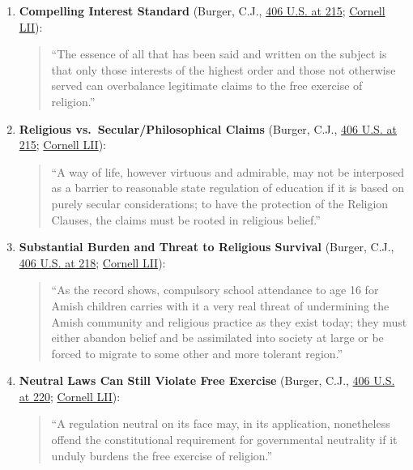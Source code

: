 \documentclass[12pt]{article}
\begin{document}
\begin{enumerate}
  \item \textbf{Compelling Interest Standard} (Burger, C.J., \href{https://supreme.justia.com/cases/federal/us/406/205/}{406 U.S. at 215}; \href{https://www.law.cornell.edu/supremecourt/text/406/205}{Cornell LII}):
  \begin{quote}
    ``The essence of all that has been said and written on the subject is that only those interests of the highest order and those not otherwise served can overbalance legitimate claims to the free exercise of religion.''
  \end{quote}

  \item \textbf{Religious vs.\ Secular/Philosophical Claims} (Burger, C.J., \href{https://supreme.justia.com/cases/federal/us/406/205/}{406 U.S. at 215}; \href{https://www.law.cornell.edu/supremecourt/text/406/205}{Cornell LII}):
  \begin{quote}
    ``A way of life, however virtuous and admirable, may not be interposed as a barrier to reasonable state regulation of education if it is based on purely secular considerations; to have the protection of the Religion Clauses, the claims must be rooted in religious belief.''
  \end{quote}

  \item \textbf{Substantial Burden and Threat to Religious Survival} (Burger, C.J., \href{https://supreme.justia.com/cases/federal/us/406/205/}{406 U.S. at 218}; \href{https://www.law.cornell.edu/supremecourt/text/406/205}{Cornell LII}):
  \begin{quote}
    ``As the record shows, compulsory school attendance to age 16 for Amish children carries with it a very real threat of undermining the Amish community and religious practice as they exist today; they must either abandon belief and be assimilated into society at large or be forced to migrate to some other and more tolerant region.''
  \end{quote}

  \item \textbf{Neutral Laws Can Still Violate Free Exercise} (Burger, C.J., \href{https://supreme.justia.com/cases/federal/us/406/205/}{406 U.S. at 220}; \href{https://www.law.cornell.edu/supremecourt/text/406/205}{Cornell LII}):
  \begin{quote}
    ``A regulation neutral on its face may, in its application, nonetheless offend the constitutional requirement for governmental neutrality if it unduly burdens the free exercise of religion.''
  \end{quote}


\end{enumerate}
\end{document}
